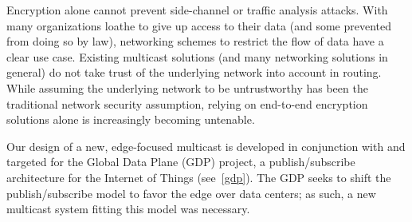 Encryption alone cannot prevent side-channel or traffic analysis attacks. With many organizations loathe to give up access to their data (and some prevented from doing so by law), networking schemes to restrict the flow of data have a clear use case. Existing multicast solutions (and many networking solutions in general) do not take trust of the underlying network into account in routing. While assuming the underlying network to be untrustworthy has been the traditional network security assumption, relying on end-to-end encryption solutions alone is increasingly becoming untenable.

Our design of a new, edge-focused multicast is developed in conjunction with and targeted for the Global Data Plane (GDP) project, a publish/subscribe architecture for the Internet of Things (see~\autoref{gdp}). The GDP seeks to shift the publish/subscribe model to favor the edge over data centers; as such, a new multicast system fitting this model was necessary.


